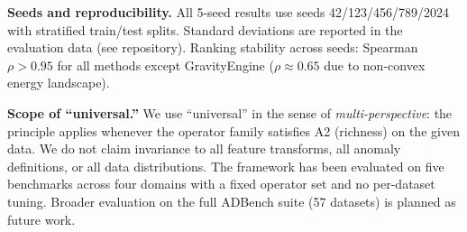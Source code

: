 \documentclass{article}
\begin{document}
\textbf{Seeds and reproducibility.} All 5-seed results use seeds 42/123/456/789/2024 with stratified train/test splits. Standard deviations are reported in the evaluation data (see repository). Ranking stability across seeds: Spearman $\rho > 0.95$ for all methods except GravityEngine ($\rho \approx 0.65$ due to non-convex energy landscape).

\textbf{Scope of ``universal.''} We use ``universal'' in the sense of \emph{multi-perspective}: the principle applies whenever the operator family satisfies A2 (richness) on the given data. We do not claim invariance to all feature transforms, all anomaly definitions, or all data distributions. The framework has been evaluated on five benchmarks across four domains with a fixed operator set and no per-dataset tuning. Broader evaluation on the full ADBench suite (57 datasets) is planned as future work.
\end{document}
